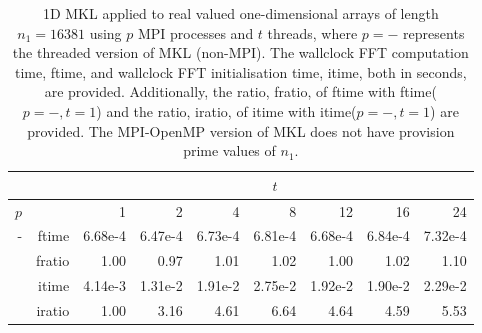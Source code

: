 \documentclass[a4]{article}
\begin{document}
\begin{table}
\begin{center}
\begin{tabular}{|r|r|r|r|r|r|r|r|r|}
\hline 
     &  & \multicolumn{7}{c|}{$t$} \\ \hline
    $p$  &  & 1           & 2    & 4    & 8    & 12   & 16    & 24  \\ \hline\hline
    -  & ftime &  6.68e-4 &   6.47e-4 &   6.73e-4 &   6.81e-4 &   6.68e-4 &   6.84e-4 &   7.32e-4    \\ 
      & fratio &  1.00 &   0.97 &   1.01 &   1.02 &   1.00 &   1.02 &   1.10    \\ 
     & itime &   4.14e-3 &   1.31e-2 &   1.91e-2 &   2.75e-2 &   1.92e-2 &   1.90e-2 &   2.29e-2      \\ 
     & iratio &   1.00 &   3.16 &   4.61 &   6.64 &   4.64 &   4.59 &   5.53    \\ \hline
\end{tabular}
\caption{1D MKL applied to real valued one-dimensional arrays of length $n_1=16381$ using $p$ MPI processes and $t$ threads, where $p=-$ represents the threaded version of MKL (non-MPI). The wallclock FFT computation time, ftime, and wallclock FFT initialisation time, itime, both in seconds, are provided. Additionally, the ratio, fratio, of ftime  with ftime($p=-,t=1$) and the ratio, iratio, of itime  with itime($p=-,t=1$) are provided. The MPI-OpenMP version of MKL does not have provision prime values of $n_1.$  }\label{Tbl:MKL1d16381}
\end{center}
\end{table}
\end{document}

